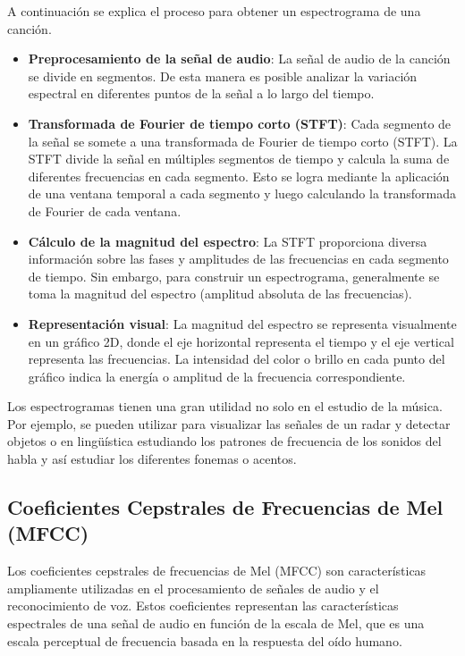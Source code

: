 A continuación se explica el proceso para obtener un espectrograma de una canción.

\begin{itemize}
\tightlist
\item \textbf{Preprocesamiento de la señal de audio}: La señal de audio de la canción se divide en segmentos. De esta manera es posible analizar la variación espectral en diferentes puntos de la señal a lo largo del tiempo.

\item \textbf{Transformada de Fourier de tiempo corto (STFT)}: Cada segmento de la señal se somete a una transformada de Fourier de tiempo corto (STFT). La STFT divide la señal en múltiples segmentos de tiempo y calcula la suma de diferentes frecuencias en cada segmento. 
Esto se logra mediante la aplicación de una ventana temporal a cada segmento y luego calculando la transformada de Fourier de cada ventana.

\item \textbf{Cálculo de la magnitud del espectro}: La STFT proporciona diversa información sobre las fases y amplitudes de las frecuencias en cada segmento de tiempo. Sin embargo, para construir un espectrograma, generalmente se toma la magnitud del espectro (amplitud absoluta de las frecuencias).

\item \textbf{Representación visual}: La magnitud del espectro se representa visualmente en un gráfico 2D, donde el eje horizontal representa el tiempo y el eje vertical representa las frecuencias. La intensidad del color o brillo en cada punto del gráfico indica la energía o amplitud de la frecuencia correspondiente.
\end{itemize}

Los espectrogramas tienen una gran utilidad no solo en el estudio de la música. Por ejemplo, se pueden utilizar para visualizar las señales de un radar y detectar objetos o en lingüística estudiando los patrones de frecuencia de los sonidos del habla y así estudiar los diferentes fonemas o acentos.


\newpage

\subsection{Coeﬁcientes Cepstrales de Frecuencias de Mel (MFCC)}
Los coeficientes cepstrales de frecuencias de Mel (MFCC) son características ampliamente utilizadas en el procesamiento de señales de audio y el reconocimiento de voz. 
Estos coeficientes representan las características espectrales de una señal de audio en función de la escala de Mel, que es una escala perceptual de frecuencia basada en la respuesta del oído humano. \cite{SAHIDULLAH2012543} \cite{Deruty_2022}

